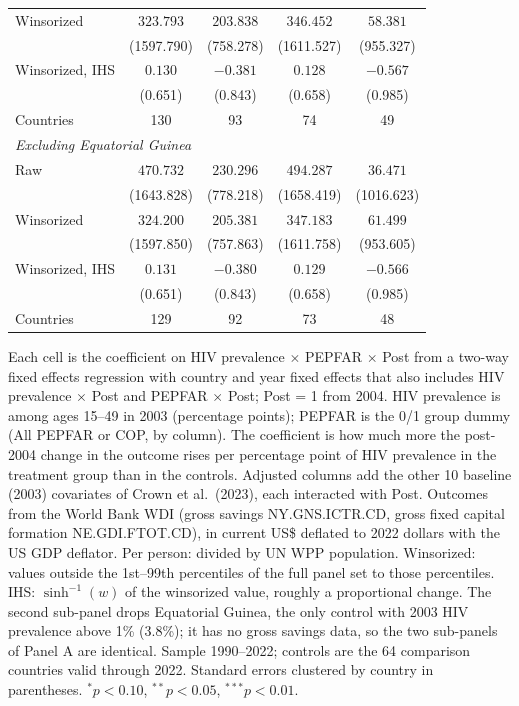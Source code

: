 \begin{table}[htbp]
\begin{tabular}{lcccc}
Winsorized & $323.793$ & $203.838$ & $346.452$ & $58.381$ \\
 & (1597.790) & (758.278) & (1611.527) & (955.327) \\
Winsorized, IHS & $0.130$ & $-0.381$ & $0.128$ & $-0.567$ \\
 & (0.651) & (0.843) & (0.658) & (0.985) \\
Countries & 130 & 93 & 74 & 49 \\
\multicolumn{5}{l}{\textit{Excluding Equatorial Guinea}} \\
Raw & $470.732$ & $230.296$ & $494.287$ & $36.471$ \\
 & (1643.828) & (778.218) & (1658.419) & (1016.623) \\
Winsorized & $324.200$ & $205.381$ & $347.183$ & $61.499$ \\
 & (1597.850) & (757.863) & (1611.758) & (953.605) \\
Winsorized, IHS & $0.131$ & $-0.380$ & $0.129$ & $-0.566$ \\
 & (0.651) & (0.843) & (0.658) & (0.985) \\
Countries & 129 & 92 & 73 & 48 \\
\bottomrule
\end{tabular}
\par\vspace{4pt}
\begin{minipage}{\textwidth}\footnotesize Each cell is the coefficient on HIV prevalence $\times$ PEPFAR $\times$ Post from a two-way fixed effects regression with country and year fixed effects that also includes HIV prevalence $\times$ Post and PEPFAR $\times$ Post; Post = 1 from 2004. HIV prevalence is among ages 15--49 in 2003 (percentage points); PEPFAR is the 0/1 group dummy (All PEPFAR or COP, by column). The coefficient is how much more the post-2004 change in the outcome rises per percentage point of HIV prevalence in the treatment group than in the controls. Adjusted columns add the other 10 baseline (2003) covariates of Crown et al.\ (2023), each interacted with Post. Outcomes from the World Bank WDI (gross savings NY.GNS.ICTR.CD, gross fixed capital formation NE.GDI.FTOT.CD), in current US\$ deflated to 2022 dollars with the US GDP deflator. Per person: divided by UN WPP population. Winsorized: values outside the 1st--99th percentiles of the full panel set to those percentiles. IHS: $\sinh^{-1}(w)$ of the winsorized value, roughly a proportional change. The second sub-panel drops Equatorial Guinea, the only control with 2003 HIV prevalence above 1\% (3.8\%); it has no gross savings data, so the two sub-panels of Panel A are identical. Sample 1990--2022; controls are the 64 comparison countries valid through 2022. Standard errors clustered by country in parentheses. $^{*}p<0.10$, $^{**}p<0.05$, $^{***}p<0.01$.\end{minipage}
\end{table}
